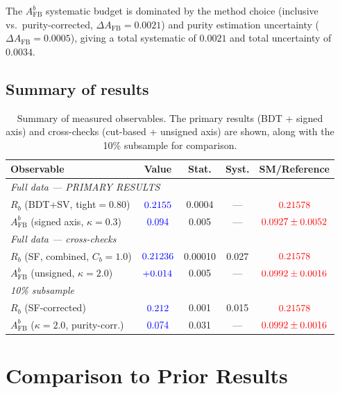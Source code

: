 \documentclass[11pt,a4paper]{article}
\newcommand{\measured}[1]{\textcolor{blue}{#1}}
\newcommand{\external}[1]{\textcolor{red}{#1}}
\begin{document}
The $A_\text{FB}^b$ systematic budget is dominated by the method
choice (inclusive vs.\ purity-corrected,
$\Delta A_\text{FB} = 0.0021$) and purity estimation uncertainty
($\Delta A_\text{FB} = 0.0005$), giving a total systematic of
$0.0021$ and total uncertainty of $0.0034$.

\subsection{Summary of results}
\label{sec:results:summary}

\begin{table}[htbp]
\centering
\caption{Summary of measured observables.
The primary results (BDT + signed axis) and cross-checks
(cut-based + unsigned axis) are shown, along with the 10\%
subsample for comparison.}
\label{tbl:results_summary}
\begin{tabular}{lcccc}
\toprule
Observable & Value & Stat. & Syst. & SM/Reference \\
\midrule
\multicolumn{5}{l}{\textit{Full data --- PRIMARY RESULTS}} \\
$R_b$ (BDT+SV, tight$=0.80$) & $\measured{0.2155}$ & 0.0004 & --- &
  $\external{0.21578}$ \\
$A_\text{FB}^b$ (signed axis, $\kappa = 0.3$) & $\measured{0.094}$ & 0.005 & --- &
  $\external{0.0927 \pm 0.0052}$ \\
\midrule
\multicolumn{5}{l}{\textit{Full data --- cross-checks}} \\
$R_b$ (SF, combined, $C_b=1.0$) & $\measured{0.21236}$ & 0.00010 & 0.027 &
  $\external{0.21578}$ \\
$A_\text{FB}^b$ (unsigned, $\kappa = 2.0$) & $\measured{+0.014}$ & 0.005 & --- &
  $\external{0.0992 \pm 0.0016}$ \\
\midrule
\multicolumn{5}{l}{\textit{10\% subsample}} \\
$R_b$ (SF-corrected) & $\measured{0.212}$ & 0.001 & 0.015 &
  $\external{0.21578}$ \\
$A_\text{FB}^b$ ($\kappa = 2.0$, purity-corr.) & $\measured{0.074}$ & 0.031 & --- &
  $\external{0.0992 \pm 0.0016}$ \\
\bottomrule
\end{tabular}
\end{table}

\section{Comparison to Prior Results}
\label{sec:comparison}
\end{document}
